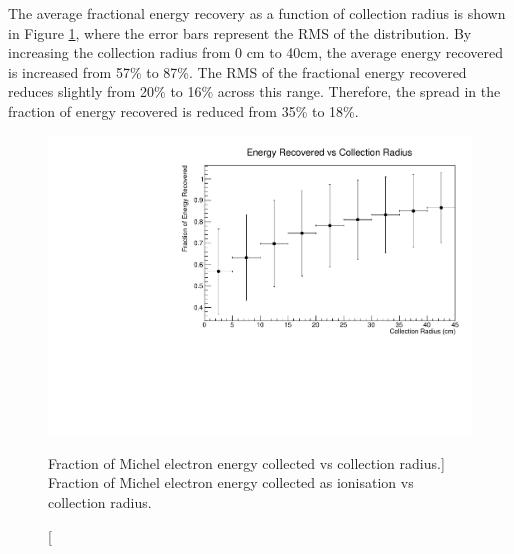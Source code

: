 The average fractional energy recovery as a function of collection radius is
shown in Figure \ref{fig:frac_v_radius}, where the error bars represent the RMS
of the distribution. By increasing the collection radius from 0 cm to 40cm, 
the average energy recovered is increased from 57\% to 87\%. The RMS of the
fractional energy recovered reduces slightly from 20\% to 16\% across this
range. Therefore, the spread in the fraction of energy recovered is reduced 
from 35\% to 18\%. 
\begin{figure}
	\centering
	\includegraphics[width=\textwidth]{figures/energy_recovery_v_radius.pdf}
	\caption
	[Fraction of Michel electron energy collected vs collection radius.]
	{Fraction of Michel electron energy collected as ionisation vs collection 
	radius.}
	\label{fig:frac_v_radius}
\end{figure}

